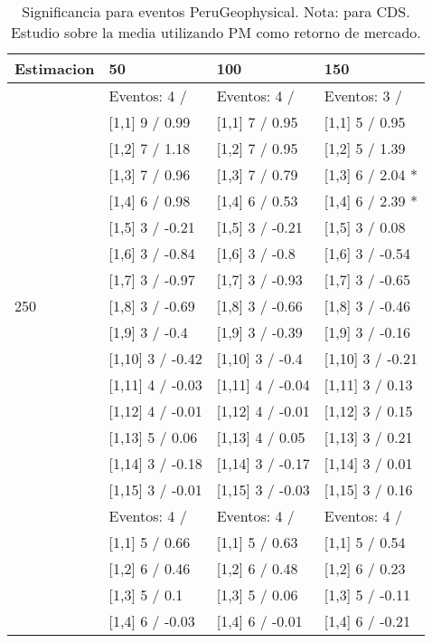 \begin{table}

\caption{Significancia para eventos PeruGeophysical. Nota: para CDS. Estudio sobre la media utilizando PM como retorno de mercado.}
\centering
\begin{tabular}[t]{llll}
\toprule
Estimacion & 50 & 100 & 150\\
\midrule
 & Eventos:  4 / & Eventos:  4 / & Eventos:  3 /\\
 & {}[1,1] 9  / 0.99 & {}[1,1] 7  / 0.95 & {}[1,1] 5  / 0.95\\
 & {}[1,2] 7  / 1.18 & {}[1,2] 7  / 0.95 & {}[1,2] 5  / 1.39\\
 & {}[1,3] 7  / 0.96 & {}[1,3] 7  / 0.79 & {}[1,3] 6  / 2.04 *\\
 & {}[1,4] 6  / 0.98 & {}[1,4] 6  / 0.53 & {}[1,4] 6  / 2.39 *\\
\addlinespace
 & {}[1,5] 3  / -0.21 & {}[1,5] 3  / -0.21 & {}[1,5] 3  / 0.08\\
 & {}[1,6] 3  / -0.84 & {}[1,6] 3  / -0.8 & {}[1,6] 3  / -0.54\\
 & {}[1,7] 3  / -0.97 & {}[1,7] 3  / -0.93 & {}[1,7] 3  / -0.65\\
250 & {}[1,8] 3  / -0.69 & {}[1,8] 3  / -0.66 & {}[1,8] 3  / -0.46\\
 & {}[1,9] 3  / -0.4 & {}[1,9] 3  / -0.39 & {}[1,9] 3  / -0.16\\
\addlinespace
 & {}[1,10] 3  / -0.42 & {}[1,10] 3  / -0.4 & {}[1,10] 3  / -0.21\\
 & {}[1,11] 4  / -0.03 & {}[1,11] 4  / -0.04 & {}[1,11] 3  / 0.13\\
 & {}[1,12] 4  / -0.01 & {}[1,12] 4  / -0.01 & {}[1,12] 3  / 0.15\\
 & {}[1,13] 5  / 0.06 & {}[1,13] 4  / 0.05 & {}[1,13] 3  / 0.21\\
 & {}[1,14] 3  / -0.18 & {}[1,14] 3  / -0.17 & {}[1,14] 3  / 0.01\\
\addlinespace
 & {}[1,15] 3  / -0.01 & {}[1,15] 3  / -0.03 & {}[1,15] 3  / 0.16\\
 & Eventos:  4 / & Eventos:  4 / & Eventos:  4 /\\
 & {}[1,1] 5  / 0.66 & {}[1,1] 5  / 0.63 & {}[1,1] 5  / 0.54\\
 & {}[1,2] 6  / 0.46 & {}[1,2] 6  / 0.48 & {}[1,2] 6  / 0.23\\
 & {}[1,3] 5  / 0.1 & {}[1,3] 5  / 0.06 & {}[1,3] 5  / -0.11\\
\addlinespace
 & {}[1,4] 6  / -0.03 & {}[1,4] 6  / -0.01 & {}[1,4] 6  / -0.21\\

\end{tabular}
\end{table}
